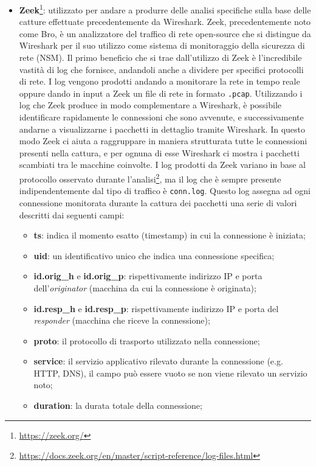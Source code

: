 \begin{itemize}
    \item \textbf{Zeek}\footnote{\url{https://zeek.org/}}: utilizzato per andare a produrre delle analisi specifiche sulla base delle catture effettuate precedentemente da Wireshark. Zeek, precedentemente noto come Bro, è un analizzatore del traffico di rete open-source che si distingue da Wireshark per il suo utilizzo come sistema di monitoraggio della sicurezza di rete (NSM). Il primo beneficio che si trae dall'utilizzo di Zeek è l'incredibile vastità di log che fornisce, andandoli anche a dividere per specifici protocolli di rete. I log vengono prodotti andando a monitorare la rete in tempo reale oppure dando in input a Zeek un file di rete in formato \texttt{.pcap}.
    Utilizzando i log che Zeek produce in modo complementare a Wireshark, è possibile identificare rapidamente le connessioni che sono avvenute, e successivamente andarne a visualizzarne i pacchetti in dettaglio tramite Wireshark. In questo modo Zeek ci aiuta a raggruppare in maniera strutturata tutte le connessioni presenti nella cattura, e per ognuna di esse Wireshark ci mostra i pacchetti scambiati tra le macchine coinvolte. I log prodotti da Zeek variano in base al protocollo osservato durante l'analisi\footnote{\url{https://docs.zeek.org/en/master/script-reference/log-files.html}}, ma il log che è sempre presente indipendentemente dal tipo di traffico è \texttt{conn.log}. Questo log assegna ad ogni connessione monitorata durante la cattura dei pacchetti una serie di valori descritti dai seguenti campi:
    \begin{itemize}
    \item \textbf{ts}: indica il momento esatto (timestamp) in cui la connessione è iniziata;
    \item \textbf{uid}: un identificativo unico che indica una connessione specifica;
    \item \textbf{id.orig\_h} e \textbf{id.orig\_p}: rispettivamente indirizzo IP e porta dell'\emph{originator} (macchina da cui la connessione è originata);
    \item \textbf{id.resp\_h} e \textbf{id.resp\_p}: rispettivamente indirizzo IP e porta del \emph{responder} (macchina che riceve la connessione);
    \item \textbf{proto}: il protocollo di trasporto utilizzato nella connessione;
    \item \textbf{service}: il servizio applicativo rilevato durante la connessione (e.g. HTTP, DNS), il campo può essere vuoto se non viene rilevato un servizio noto;
    \item \textbf{duration}: la durata totale della connessione;

\end{itemize}
\end{itemize}

